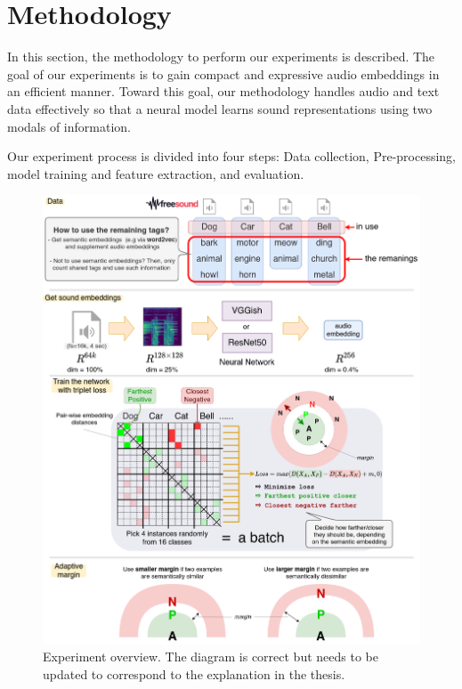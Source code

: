 
\chapter{Methodology}

In this section, the methodology to perform our experiments is described. The goal of our experiments is to gain compact and expressive audio embeddings in an efficient manner. Toward this goal, our methodology handles audio and text data effectively so that a neural model learns sound representations using two modals of information. 

Our experiment process is divided into four steps: Data collection, Pre-processing, model training and feature extraction, and evaluation. 


\begin{figure}[htb]
	\centering
	\includegraphics[width=15cm]{Figures/Triplet-Loss_Semantic.png}
	\caption{Experiment overview. The diagram is correct but needs to be updated to correspond to the explanation in the thesis.}
	\label{toc-figrue}
\end{figure}

